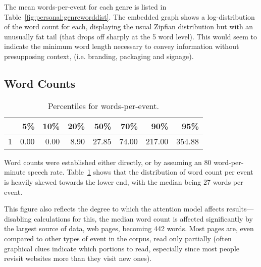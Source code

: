 The mean words-per-event for each genre is listed in Table~\ref{fig:personal:genreworddist}.  The embedded graph shows a log-distribution of the word count for each, displaying the usual Zipfian distribution but with an unusually fat tail (that drops off sharply at the 5 word level).  This would seem to indicate the minimum word length necessary to convey information without presupposing context, (i.e. branding, packaging and signage).





\subsection{Word Counts}

\begin{table}[ht]
    \centering



    \begin{tabular}{rrrrrrrr}
        \hline
        & 5\% & 10\% & 20\% & 50\% & 70\% & 90\% & 95\% \\ 
        \hline
        1 & 0.00 & 0.00 & 8.90 & 27.85 & 74.00 & 217.00 & 354.88 \\ 
        \hline
    \end{tabular}
    \caption{Percentiles for words-per-event.}
    \label{table:personal:wordsperevent}
\end{table}

Word counts were established either directly, or by assuming an 80 word-per-minute speech rate.  Table~\ref{table:personal:wordsperevent} shows that the distribution of word count per event is heavily skewed towards the lower end, with the median being 27 words per event.

This figure also reflects the degree to which the attention model affects results---disabling calculations for this, the median word count is affected significantly by the largest source of data, web pages, becoming 442 words.  Most pages are, even compared to other types of event in the corpus, read only partially (often graphical clues indicate which portions to read, especially since most people revisit websites more than they visit new ones).








